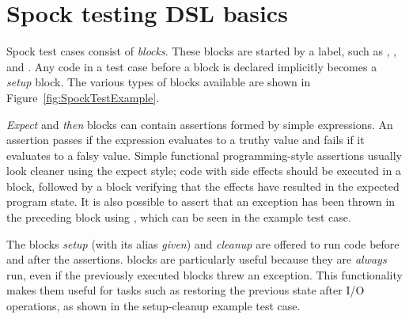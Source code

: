 \section{Spock testing DSL basics}
Spock test cases consist of \textit{blocks}.
These blocks are started by a label,
such as , , and .
Any code in a test case before a block is declared
implicitly becomes a \textit{setup} block.
\autocite[Chapter: Spock Primer - Feature Methods - Blocks]{SpockFrameworkDoc}
The various types of blocks available
are shown in Figure~\ref{fig:SpockTestExample}.

\textit{Expect} and \textit{then} blocks
can contain assertions formed by simple expressions.
An assertion passes if the expression evaluates to a truthy value
and fails if it evaluates to a falsy value.
Simple functional programming-style assertions
usually look cleaner using the expect style;
code with side effects should be executed in a  block,
followed by a  block verifying that
the effects have resulted in the expected program state.
It is also possible to assert that an exception
has been thrown in the preceding  block using ,
which can be seen in the  example test case.

The blocks \textit{setup} (with its alias \textit{given}) and \textit{cleanup}
are offered to run code before and after the assertions.
 blocks are particularly useful because they are \textit{always} run,
even if the previously executed blocks threw an exception.
\autocite[Chapter: Spock Primer - Feature Methods - Blocks]{SpockFrameworkDoc}
This functionality makes them useful for tasks
such as restoring the previous state after I/O operations,
as shown in the setup-cleanup example test case.

